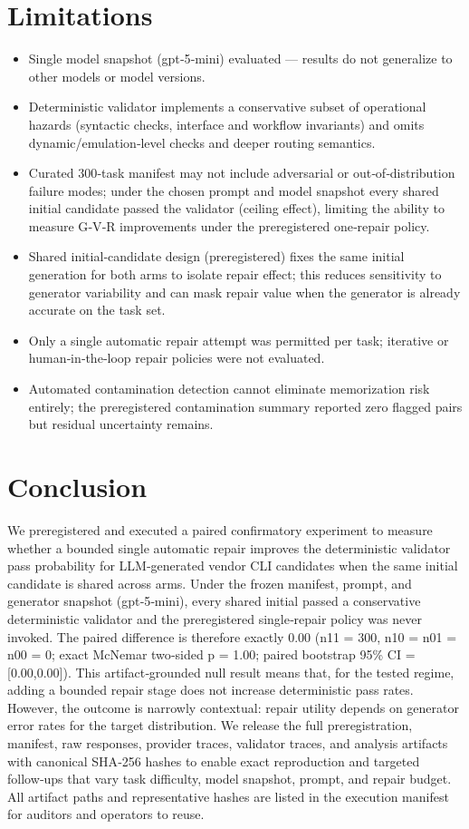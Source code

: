 \documentclass[conference]{IEEEtran}
\begin{document}
\section{Limitations}
\begin{itemize}
\item Single model snapshot (gpt‑5‑mini) evaluated --- results do not generalize to other models or model versions.
\item Deterministic validator implements a conservative subset of operational hazards (syntactic checks, interface and workflow invariants) and omits dynamic/emulation‑level checks and deeper routing semantics.
\item Curated 300‑task manifest may not include adversarial or out‑of‑distribution failure modes; under the chosen prompt and model snapshot every shared initial candidate passed the validator (ceiling effect), limiting the ability to measure G‑V‑R improvements under the preregistered one‑repair policy.
\item Shared initial‑candidate design (preregistered) fixes the same initial generation for both arms to isolate repair effect; this reduces sensitivity to generator variability and can mask repair value when the generator is already accurate on the task set.
\item Only a single automatic repair attempt was permitted per task; iterative or human‑in‑the‑loop repair policies were not evaluated.
\item Automated contamination detection cannot eliminate memorization risk entirely; the preregistered contamination summary reported zero flagged pairs but residual uncertainty remains.
\end{itemize}

\section{Conclusion}
We preregistered and executed a paired confirmatory experiment to measure whether a bounded single automatic repair improves the deterministic validator pass probability for LLM‑generated vendor CLI candidates when the same initial candidate is shared across arms. Under the frozen manifest, prompt, and generator snapshot (gpt‑5‑mini), every shared initial passed a conservative deterministic validator and the preregistered single‑repair policy was never invoked. The paired difference is therefore exactly 0.00 (n11 = 300, n10 = n01 = n00 = 0; exact McNemar two‑sided p = 1.00; paired bootstrap 95\% CI = [0.00,0.00]). This artifact‑grounded null result means that, for the tested regime, adding a bounded repair stage does not increase deterministic pass rates. However, the outcome is narrowly contextual: repair utility depends on generator error rates for the target distribution. We release the full preregistration, manifest, raw responses, provider traces, validator traces, and analysis artifacts with canonical SHA‑256 hashes to enable exact reproduction and targeted follow‑ups that vary task difficulty, model snapshot, prompt, and repair budget. All artifact paths and representative hashes are listed in the execution manifest for auditors and operators to reuse.
\end{document}
